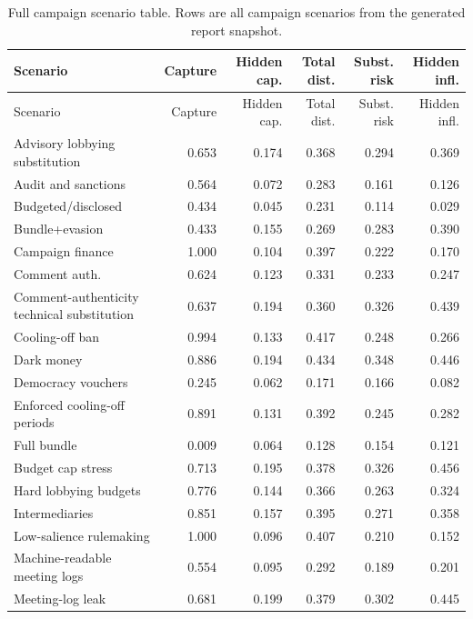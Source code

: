 \begingroup
\scriptsize
\setlength{\tabcolsep}{3pt}
\begin{longtable}{lrrrrr}
\caption{Full campaign scenario table. Rows are all campaign scenarios from the generated report snapshot.}\label{tab:full-campaign-appendix}\\
\toprule
Scenario & Capture & Hidden cap. & Total dist. & Subst. risk & Hidden infl. \\
\midrule
\endfirsthead
\toprule
Scenario & Capture & Hidden cap. & Total dist. & Subst. risk & Hidden infl. \\
\midrule
\endhead
Advisory lobbying substitution & 0.653 & 0.174 & 0.368 & 0.294 & 0.369 \\
Audit and sanctions & 0.564 & 0.072 & 0.283 & 0.161 & 0.126 \\
Budgeted/disclosed & 0.434 & 0.045 & 0.231 & 0.114 & 0.029 \\
Bundle+evasion & 0.433 & 0.155 & 0.269 & 0.283 & 0.390 \\
Campaign finance & 1.000 & 0.104 & 0.397 & 0.222 & 0.170 \\
Comment auth. & 0.624 & 0.123 & 0.331 & 0.233 & 0.247 \\
Comment-authenticity technical substitution & 0.637 & 0.194 & 0.360 & 0.326 & 0.439 \\
Cooling-off ban & 0.994 & 0.133 & 0.417 & 0.248 & 0.266 \\
Dark money & 0.886 & 0.194 & 0.434 & 0.348 & 0.446 \\
Democracy vouchers & 0.245 & 0.062 & 0.171 & 0.166 & 0.082 \\
Enforced cooling-off periods & 0.891 & 0.131 & 0.392 & 0.245 & 0.282 \\
Full bundle & 0.009 & 0.064 & 0.128 & 0.154 & 0.121 \\
Budget cap stress & 0.713 & 0.195 & 0.378 & 0.326 & 0.456 \\
Hard lobbying budgets & 0.776 & 0.144 & 0.366 & 0.263 & 0.324 \\
Intermediaries & 0.851 & 0.157 & 0.395 & 0.271 & 0.358 \\
Low-salience rulemaking & 1.000 & 0.096 & 0.407 & 0.210 & 0.152 \\
Machine-readable meeting logs & 0.554 & 0.095 & 0.292 & 0.189 & 0.201 \\
Meeting-log leak & 0.681 & 0.199 & 0.379 & 0.302 & 0.445 \\

\end{longtable}
